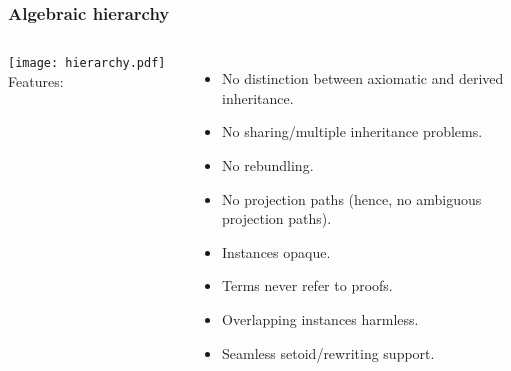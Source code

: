 \documentclass{beamer}
\begin{document}
\begin{frame}[fragile]
\frametitle{Algebraic hierarchy}

\begin{columns}
    \texttt{[image: hierarchy.pdf]}
Features:
\begin{itemize}
\item No distinction between axiomatic and derived inheritance.
\item No sharing/multiple inheritance problems.
\item No rebundling.
\item No projection paths (hence, no ambiguous projection paths).
\item Instances opaque. %
\item Terms never refer to proofs. %
\item Overlapping instances harmless. %
\item Seamless setoid/rewriting support.
\end{itemize}
\end{columns}
\end{frame}

\end{document}
